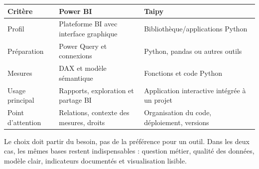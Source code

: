 \documentclass[
  french,
  letterpaper,
  open=any]{scrbook}
\newcounter{none} %
\theoremstyle{definition}
\theoremstyle{definition}
\theoremstyle{remark}
\begin{document}
{\def\LTcaptype{none} %
\begin{longtable}[]{@{}
  >{\raggedright\arraybackslash}p{}
  >{\raggedright\arraybackslash}p{}
  >{\raggedright\arraybackslash}p{}@{}}
\toprule\noalign{}
\begin{minipage}[b]{\linewidth}\raggedright
Critère
\end{minipage} & \begin{minipage}[b]{\linewidth}\raggedright
Power BI
\end{minipage} & \begin{minipage}[b]{\linewidth}\raggedright
Taipy
\end{minipage} \\
\midrule\noalign{}
\endhead
\bottomrule\noalign{}
\endlastfoot
Profil & Plateforme BI avec interface graphique &
Bibliothèque/applications Python \\
Préparation & Power Query et connexions & Python, pandas ou autres
outils \\
Mesures & DAX et modèle sémantique & Fonctions et code Python \\
Usage principal & Rapports, exploration et partage BI & Application
interactive intégrée à un projet \\
Point d'attention & Relations, contexte des mesures, droits &
Organisation du code, déploiement, versions \\
\end{longtable}
}

Le choix doit partir du besoin, pas de la préférence pour un outil. Dans
les deux cas, les mêmes bases restent indispensables : question métier,
qualité des données, modèle clair, indicateurs documentés et
visualisation lisible.
\end{document}
